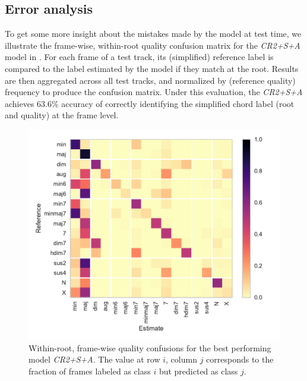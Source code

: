\documentclass{article}
\begin{document}
\subsection{Error analysis}

To get some more insight about the mistakes made by the model at test time, we illustrate the frame-wise, within-root quality confusion matrix for the \emph{CR2+S+A} model in .
For each frame of a test track, its (simplified) reference label is compared to the label estimated by the model if they match at the root.
Results are then aggregated across all test tracks, and normalized by (reference quality) frequency to produce the confusion matrix.
Under this evaluation, the \emph{CR2+S+A} achieves 63.6\% accuracy of correctly identifying the simplified chord label (root and quality) at the frame level.

\begin{figure}
    \centering
    \includegraphics[width=\columnwidth]{qualconf}
    \caption{Within-root, frame-wise quality confusions for the best performing model \emph{CR2+S+A}.
    The value at row $i$, column $j$ corresponds to the fraction of frames labeled as class $i$ but predicted as class $j$.\label{fig:confusion}}
\end{figure}
\end{document}
